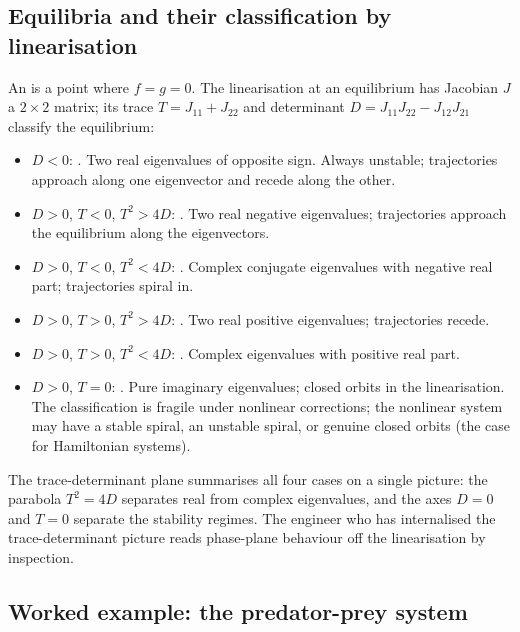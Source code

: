 \subsection{Equilibria and their classification by linearisation}

An  is a point where $f = g = 0$. The
linearisation at an equilibrium has Jacobian $J$ a $2 \times 2$
matrix; its trace $T = J_{11} + J_{22}$ and determinant $D =
J_{11} J_{22} - J_{12} J_{21}$ classify the equilibrium:

\begin{itemize}[leftmargin=*]
  \item $D < 0$: . Two real eigenvalues of opposite
    sign. Always unstable; trajectories approach along one
    eigenvector and recede along the other.
  \item $D > 0$, $T < 0$, $T^{2} > 4D$: . Two
    real negative eigenvalues; trajectories approach the equilibrium
    along the eigenvectors.
  \item $D > 0$, $T < 0$, $T^{2} < 4D$: .
    Complex conjugate eigenvalues with negative real part;
    trajectories spiral in.
  \item $D > 0$, $T > 0$, $T^{2} > 4D$: .
    Two real positive eigenvalues; trajectories recede.
  \item $D > 0$, $T > 0$, $T^{2} < 4D$: .
    Complex eigenvalues with positive real part.
  \item $D > 0$, $T = 0$: . Pure imaginary
    eigenvalues; closed orbits in the linearisation. The
    classification is fragile under nonlinear corrections; the
    nonlinear system may have a stable spiral, an unstable spiral,
    or genuine closed orbits (the case for Hamiltonian systems).
\end{itemize}

The trace-determinant plane summarises all four cases on a single
picture: the parabola $T^{2} = 4 D$ separates real from complex
eigenvalues, and the axes $D = 0$ and $T = 0$ separate the
stability regimes. The engineer who has internalised the
trace-determinant picture reads phase-plane behaviour off the
linearisation by inspection.





\subsection{Worked example: the predator-prey system}

